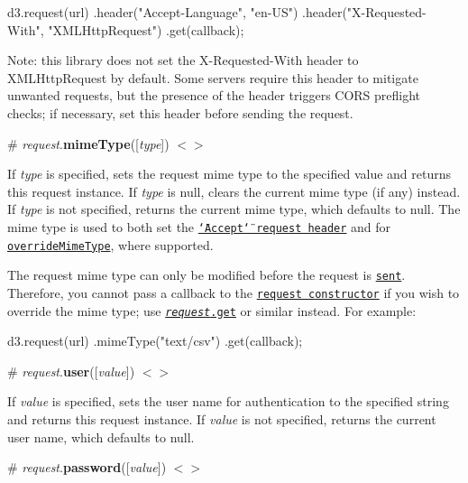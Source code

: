 \begin{DoxyCode}
d3.request(url)
    .header("Accept-Language", "en-US")
    .header("X-Requested-With", "XMLHttpRequest")
    .get(callback);
\end{DoxyCode}


Note\+: this library does not set the X-\/\+Requested-\/\+With header to {\ttfamily X\+M\+L\+Http\+Request} by default. Some servers require this header to mitigate unwanted requests, but the presence of the header triggers C\+O\+RS preflight checks; if necessary, set this header before sending the request.

\label{_request_mimeType}%
\# {\itshape request}.{\bfseries mime\+Type}(\mbox{[}{\itshape type}\mbox{]}) \href{https://github.com/d3/d3-request/blob/master/src/request.js#L60}{\tt $<$$>$}

If {\itshape type} is specified, sets the request mime type to the specified value and returns this request instance. If {\itshape type} is null, clears the current mime type (if any) instead. If {\itshape type} is not specified, returns the current mime type, which defaults to null. The mime type is used to both set the \href{http://www.w3.org/Protocols/rfc2616/rfc2616-sec14.html}{\tt \char`\"{}\+Accept\char`\"{} request header} and for \href{http://www.w3.org/TR/XMLHttpRequest/#the-overridemimetype%28%29-method}{\tt override\+Mime\+Type}, where supported.

The request mime type can only be modified before the request is \href{#request_send}{\tt sent}. Therefore, you cannot pass a callback to the \href{#request}{\tt request constructor} if you wish to override the mime type; use \href{#request_get}{\tt {\itshape request}.get} or similar instead. For example\+:


\begin{DoxyCode}
d3.request(url)
    .mimeType("text/csv")
    .get(callback);
\end{DoxyCode}


\label{_request_user}%
\# {\itshape request}.{\bfseries user}(\mbox{[}{\itshape value}\mbox{]}) \href{https://github.com/d3/d3-request/blob/master/src/request.js#L80}{\tt $<$$>$}

If {\itshape value} is specified, sets the user name for authentication to the specified string and returns this request instance. If {\itshape value} is not specified, returns the current user name, which defaults to null.

\label{_request_password}%
\# {\itshape request}.{\bfseries password}(\mbox{[}{\itshape value}\mbox{]}) \href{https://github.com/d3/d3-request/blob/master/src/request.js#L84}{\tt $<$$>$}

